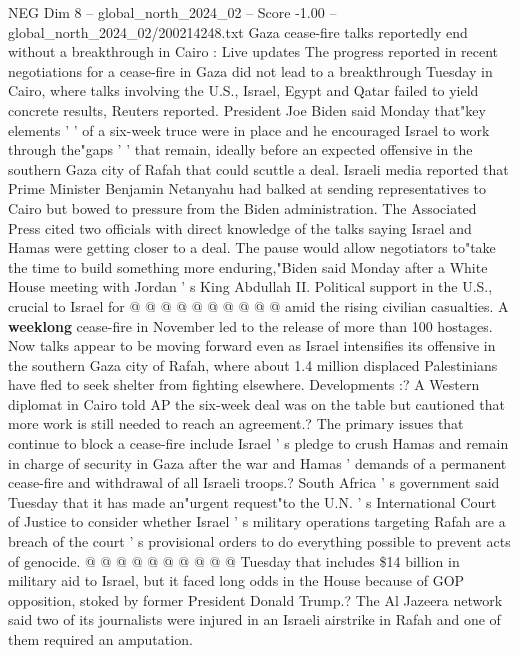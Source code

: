 \begin{textsample}{NEG Dim 8 – global\_north\_2024\_02 – Score -1.00 – global\_north\_2024\_02/200214248.txt}  \label{ex:f8_neg_233}
Gaza cease-fire talks reportedly end without a breakthrough in Cairo : Live updates The progress reported in recent negotiations for a cease-fire in Gaza did not lead to a breakthrough Tuesday in Cairo, where talks involving the U.S., Israel, Egypt and Qatar failed to yield concrete results, Reuters reported.
President Joe Biden said Monday that"key elements ' ' of a six-week truce were in place and he encouraged Israel to work through the"gaps ' ' that remain, ideally before an expected offensive in the southern Gaza city of Rafah that could scuttle a deal.
Israeli media reported that Prime Minister Benjamin Netanyahu had balked at sending representatives to Cairo but bowed to pressure from the Biden administration.
The Associated Press cited two officials with direct knowledge of the talks saying Israel and Hamas were getting closer to a deal.
The pause would allow negotiators to"take the time to build something more enduring,"Biden said Monday after a White House meeting with Jordan ' s King Abdullah II.
Political support in the U.S., crucial to Israel for @ @ @ @ @ @ @ @ @ @ amid the rising civilian casualties.
A \textbf{weeklong} cease-fire in November led to the release of more than 100 hostages.
Now talks appear to be moving forward even as Israel intensifies its offensive in the southern Gaza city of Rafah, where about 1.4 million displaced Palestinians have fled to seek shelter from fighting elsewhere.
Developments :?
A Western diplomat in Cairo told AP the six-week deal was on the table but cautioned that more work is still needed to reach an agreement.?
The primary issues that continue to block a cease-fire include Israel ' s pledge to crush Hamas and remain in charge of security in Gaza after the war and Hamas ' demands of a permanent cease-fire and withdrawal of all Israeli troops.?
South Africa ' s government said Tuesday that it has made an"urgent request"to the U.N. ' s International Court of Justice to consider whether Israel ' s military operations targeting Rafah are a breach of the court ' s provisional orders to do everything possible to prevent acts of genocide. @ @ @ @ @ @ @ @ @ @ Tuesday that includes \$14 billion in military aid to Israel, but it faced long odds in the House because of GOP opposition, stoked by former President Donald Trump.?
The Al Jazeera network said two of its journalists were injured in an Israeli airstrike in Rafah and one of them required an amputation.

\end{textsample}
